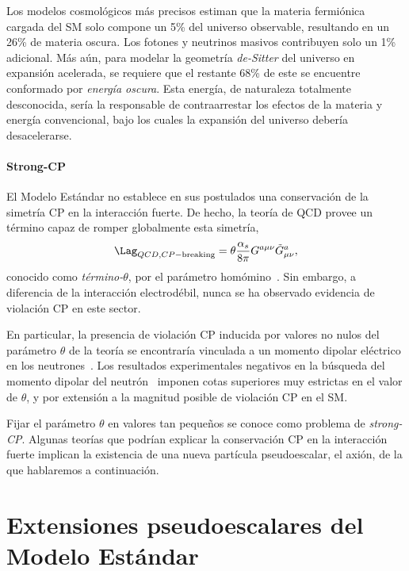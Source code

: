 Los modelos cosmológicos más precisos estiman que la materia fermiónica cargada del SM solo compone un 5\% del universo observable, resultando en un 26\% de materia oscura. Los fotones y neutrinos masivos contribuyen solo un 1\% adicional. Más aún, para modelar la geometría \textit{de-Sitter} del universo en expansión acelerada, se requiere que el restante 68\% de este se encuentre conformado por \textit{energía oscura}. Esta energía, de naturaleza totalmente desconocida, sería la responsable de contraarrestar los efectos de la materia y energía convencional, bajo los cuales la expansión del universo debería desacelerarse.


\paragraph{Strong-CP}

El Modelo Estándar no establece en sus postulados una conservación de la simetría CP en la interacción fuerte. De hecho, la teoría de QCD provee un término capaz de romper globalmente esta simetría, 
\begin{equation}
  \Lag_{QCD, CP-\text{breaking}} = \theta \frac{\alpha_s}{8\pi} G^{a\mu\nu} \tilde{G}^a_{\mu\nu},
  \label{eq:ch1:SM:limitations:QCD_CP-breaking}
\end{equation}
conocido como \textit{término-$\theta$}, por el parámetro homómino~\cite{Baluni1979}. Sin embargo, a diferencia de la interacción electrodébil, nunca se ha observado evidencia de violación CP en este sector. 

En particular, la presencia de violación CP inducida por valores no nulos del parámetro $\theta$ de la teoría se encontraría vinculada a un momento dipolar eléctrico en los neutrones~\cite{Crewther1979}. Los resultados experimentales negativos en la búsqueda del momento dipolar del neutrón~\cite{Harris1999} imponen cotas superiores muy estrictas en el valor de $\theta$, y por extensión a la magnitud posible de violación CP en el SM. 

Fijar el parámetro $\theta$ en valores tan pequeños se conoce como problema de \textit{strong-CP}. Algunas teorías que podrían explicar la conservación CP en la interacción fuerte implican la existencia de una nueva partícula pseudoescalar, el axión, de la que hablaremos a continuación.




\section{Extensiones pseudoescalares del Modelo Estándar}

